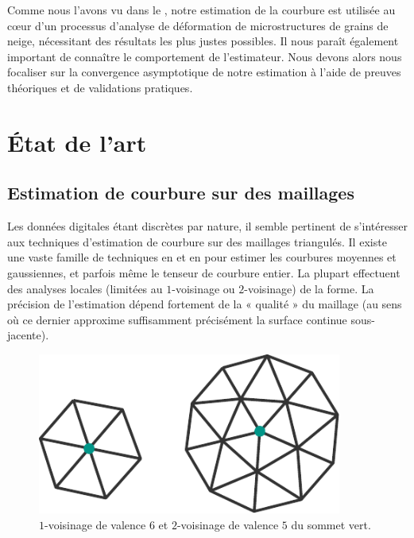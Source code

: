 Comme nous l'avons vu dans le , notre estimation
de la courbure est utilisée au cœur d'un processus d'analyse de
déformation de microstructures de grains de neige, nécessitant des résultats les
plus justes possibles. Il nous paraît également important de connaître le
comportement de l'estimateur.
%
%
Nous devons alors nous focaliser sur la convergence asymptotique de
notre estimation à l'aide de preuves théoriques et de validations pratiques.
%
\section{État de l'art}%
\label{sec:estimators:SOTA}
%
\subsection{Estimation de courbure sur des maillages}
%
Les données digitales étant discrètes par nature, il semble pertinent de
s'intéresser aux techniques d'estimation de courbure sur des maillages
triangulés. Il existe une vaste famille de techniques en \ComputerGraphics et en
\GeometryProcessing pour estimer les courbures moyennes et gaussiennes, et
parfois même le tenseur de courbure entier. La plupart effectuent des analyses
locales (\cad limitées au $1$-voisinage ou $2$-voisinage) de la forme. La
précision de l'estimation dépend fortement de la « qualité » du maillage (au
sens où ce dernier approxime suffisamment précisément la surface continue sous-jacente).

\begin{figure}[ht]
    \begin{center}
      \includegraphics[width=10cm]{figures/OneRingNeighborhood}
    \end{center}
    \caption{$1$-voisinage de valence $6$ et
    $2$-voisinage de valence $5$ du sommet vert.}
    \label{fig:one-ring-neighborhood}
\end{figure}


